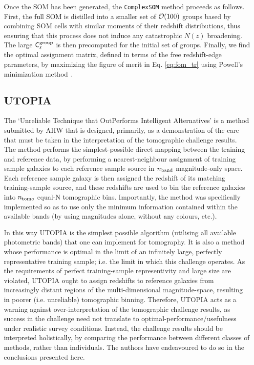 \documentclass[twocolumn,twocolappendix]{aastex63}
\begin{document}
Once the SOM has been generated, the {\tt ComplexSOM} method proceeds as
follows. First, the full SOM is distilled into a smaller set of ${\cal O}(100)$
groups based by combining SOM cells with similar moments of their redshift
distributions, thus ensuring that this process does not induce any catastrophic
$N(z)$ broadening.
The large ${\sf C}^{\rm group}_\ell$ is then precomputed for the initial set of
groups. Finally, we find the optimal assignment matrix, defined in terms of the
free redshift-edge parameters, by maximizing the figure of merit in Eq.
\ref{eq:fom_tr} using Powell's minimization method
\citep{10.1093/comjnl/7.2.155}.




\subsection{ {\sc UTOPIA} }\label{sec:utopia}

The `Unreliable Technique that OutPerforms Intelligent Alternatives' is a method
submitted by AHW that is designed,  primarily, as a demonstration of the care
that must be taken in the interpretation of the tomographic challenge results. 
The method performs  the simplest-possible direct mapping between the training
and reference data, by performing a nearest-neighbour  assignment of training
sample galaxies to each reference sample source in $n_{\rm band}$ magnitude-only
space. Each reference  sample galaxy is then assigned the redshift of its
matching training-sample source, and these redshifts are  used to bin the
reference galaxies into $n_{\rm tomo}$ equal-N tomographic bins. Importantly,
the method was specifically  implemented so as to use only the minimum
information contained within the available bands (by using magnitudes alone,
without  any colours, etc.). 

In this way UTOPIA is the simplest possible algorithm (utilising all available
photometric bands) that one can  implement for tomography. It is also a method
whose performance is optimal in the limit of an infinitely large,  perfectly
representative training sample; i.e. the limit in which this challenge operates.
As the requirements of perfect  training-sample representivity and large size
are violated, UTOPIA ought to assign redshifts to reference  galaxies from
increasingly distant regions of the multi-dimensional magnitude-space, resulting
in poorer (i.e. unreliable) tomographic binning.  Therefore, UTOPIA acts as a warning against
over-interpretation of the tomographic challenge results, as success in the
challenge  need not translate to optimal-performance/usefulness under realistic
survey conditions. Instead, the challenge results should be interpreted
holistically, by comparing the performance between different classes of methods,
rather than individuals. The authors have endeavoured to do so in the conclusions presented here.
\end{document}
